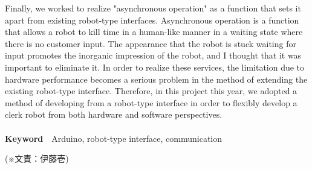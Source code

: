 Finally, we worked to realize "asynchronous operation" as a function that sets it apart from existing robot-type interfaces.
Asynchronous operation is a function that allows a robot to kill time in a human-like manner in a waiting state where there is no customer input.
The appearance that the robot is stuck waiting for input promotes the inorganic impression of the robot, and I thought that it was important to eliminate it.
In order to realize these services, the limitation due to hardware performance becomes a serious problem in the method of extending the existing robot-type interface.
Therefore, in this project this year, we adopted a method of developing from a robot-type interface in order to flexibly develop a clerk robot from both hardware and software perspectives.
\\\\
\noindent
{\bf\gt Keyword}　Arduino, robot-type interface, communication
\begin{flushright}
(※文責：伊藤壱)
\end{flushright}